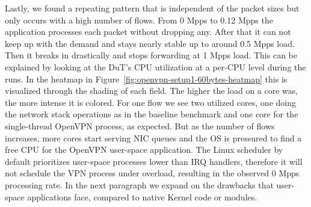\documentclass[IN,11pt,twoside,openright,master,english]{tumthesis}
\begin{document}
Lastly, we found a repeating pattern that is independent of the packet sizes but only occurs with a high number of flows. From 0 Mpps to 0.12 Mpps the application processes each packet without dropping any. After that it can not keep up with the demand and stays nearly stable up to around 0.5 Mpps load. Then it breaks in drastically and stops forwarding at 1 Mpps load. 
This can be explained by looking at the DuT's CPU utilization at a per-CPU level during the runs. In the heatmap in Figure~\ref{fig:openvpn-setup1-60bytes-heatmap} this is visualized through the shading of each field. The higher the load on a core was, the more intense it is colored. For one flow we see two utilized cores, one doing the network stack operations as in the baseline benchmark and one core for the single-thread OpenVPN process, as expected. But as the number of flows increases, more cores start serving NIC queues and the OS is pressured to find a free CPU for the OpenVPN user-space application. The Linux scheduler by default prioritizes user-space processes lower than IRQ handlers, therefore it will not schedule the VPN process under overload, resulting in the observed 0 Mpps processing rate. In the next paragraph we expand on the drawbacks that user-space applications face, compared to native Kernel code or modules. 
\end{document}
